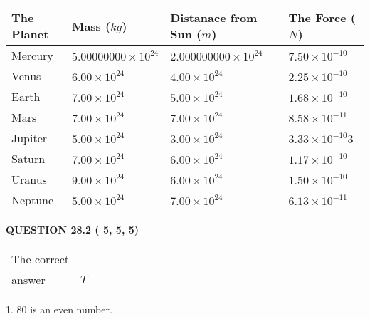 \documentclass[12pt]{article}
\begin{document}
 
\begin{tabular}{|l|l|l|l|}
\hline
The Planet & Mass ($kg$) & Distanace from Sun ($m$) & The Force ($N$)\\
\hline
Mercury  &
           $ %
5.00000000 \times 10^{24}  $   &
             $ %
2.000000000 \times 10^{24}$    & $ %
7.50 \times 10^{-10} $
\\  \hline
Venus    &
           $  %
6.00 \times 10^{24}  $     &
             $ %
4.00 \times 10^{24} $    & $ %
2.25 \times 10^{-10} $
\\  \hline
Earth    &
           $  %
7.00 \times 10^{24}$     &
             $ %
5.00 \times 10^{24} $    & $ %
1.68 \times 10^{-10} $
\\   \hline
Mars     &
           $  %
7.00 \times 10^{24} $     &
             $ %
7.00 \times 10^{24}$    & $ %
8.58 \times 10^{-11} $
\\   \hline
Jupiter  &
           $  %
5.00 \times 10^{24}  $    &
             $ %
3.00 \times 10^{24} $    & $ %
3.33 \times 10^{-10}3 $
\\  \hline
Saturn   &
           $  %
7.00 \times 10^{24}   $    &
             $ %
6.00 \times 10^{24}  $    & $ %
1.17 \times 10^{-10} $
\\  \hline
Uranus   &
           $  %
9.00 \times 10^{24} $    &
             $ %
6.00 \times 10^{24}$    & $ %
1.50 \times 10^{-10} $
\\  \hline
Neptune  &
           $  %
5.00 \times 10^{24}  $    &
             $ %
7.00 \times 10^{24} $    & $ %
6.13 \times 10^{-11} $
\\  \hline
 
\end{tabular}
 
 
 
 
  
\vspace{0.2in}
  
{\textbf{\Large{QUESTION
28.2 
 (          5,          5,          5)
}}}
  
  
 
 
\noindent{}

 
\noindent\begin{tabular}{|l|l|}\hline The correct & \\
          answer &  %
$T$ \\ \hline \end{tabular}
1. $ %
80$ is an  %
even number.
 
\end{document}
